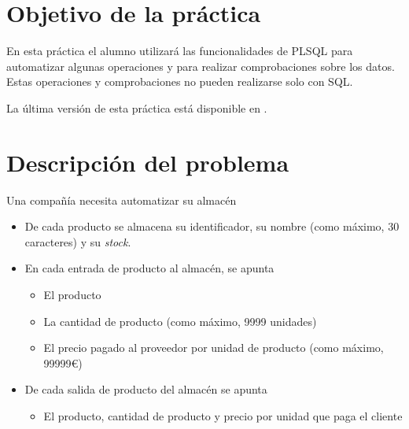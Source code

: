 
\usepackage{needspace}




\renewcommand{\hmwkTitle}{Práctica PLSQL}
\renewcommand{\hmwkClass}{Gestión de Bases de datos}







\primerapagina


\section{Objetivo de la práctica}
En esta práctica el alumno utilizará las funcionalidades de PLSQL para automatizar algunas operaciones y para realizar comprobaciones sobre los datos. Estas operaciones y comprobaciones no pueden realizarse solo con SQL.

La última versión de esta práctica está disponible en .


\section{Descripción del problema}
Una compañía necesita automatizar su almacén
\begin{itemize}
\item De cada producto se almacena su identificador, su nombre (como máximo, 30 caracteres) y su \textit{stock}.
\item En cada entrada de producto al almacén, se apunta
  \begin{itemize}
  \item El producto
  \item La cantidad de producto (como máximo, 9999 unidades)
  \item El precio pagado al proveedor por unidad de producto (como máximo, 99999\euro)
  \end{itemize}
\item De cada salida de producto del almacén se apunta
  \begin{itemize}
  \item El producto, cantidad de producto y precio por unidad que paga el cliente
  \end{itemize}
\end{itemize}




